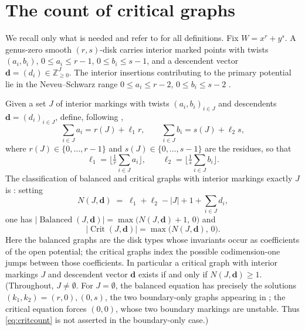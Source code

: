 \documentclass[11pt]{amsart}
\theoremstyle{definition}
\theoremstyle{remark}
\newcommand{\ZZ}{\mathbb{Z}}
\newcommand{\Crit}{\operatorname{Crit}}
\newcommand{\Bal}{\operatorname{Balanced}}
\begin{document}
\section{The count of critical graphs}
\label{sec:count}

We recall only what is needed and refer to \cite{GKT} for all definitions. Fix
$W=x^{r}+y^{s}$. A genus-zero smooth $(r,s)$-disk carries interior marked points
with twists $(a_{i},b_{i})$, $0\leq a_{i}\leq r-1$, $0\leq b_{i}\leq s-1$, and a
descendent vector $\mathbf d=(d_{i})\in\ZZ_{\geq0}^{J}$. The interior insertions
contributing to the primary potential lie in the Neveu--Schwarz range
$0\leq a_{i}\leq r-2$, $0\leq b_{i}\leq s-2$ \cite[eqn.~(0.5)]{GKT}.

Given a set $J$ of interior markings with twists $(a_{i},b_{i})_{i\in J}$ and
descendents $\mathbf d=(d_{i})_{i\in J}$, define, following
\cite[Notation~2.30]{GKT},
\begin{equation}
\label{eq:ells}
\sum_{i\in J}a_{i}=r(J)+\ell_{1}r,\qquad
\sum_{i\in J}b_{i}=s(J)+\ell_{2}s,
\end{equation}
where $r(J)\in\{0,\dots,r-1\}$ and $s(J)\in\{0,\dots,s-1\}$ are the residues, so
that
\begin{equation}
\label{eq:elldef}
\ell_{1}=\Big\lfloor\tfrac{1}{r}\textstyle\sum_{i\in J}a_{i}\Big\rfloor,\qquad
\ell_{2}=\Big\lfloor\tfrac{1}{s}\textstyle\sum_{i\in J}b_{i}\Big\rfloor.
\end{equation}
The classification of balanced and critical graphs with interior markings
exactly $J$ is \cite[Notation~2.40]{GKT}: setting
\begin{equation}
\label{eq:N}
N(J,\mathbf d)\;=\;\ell_{1}+\ell_{2}-|J|+1+\sum_{i\in J}d_{i},
\end{equation}
one has $\bigl|\Bal(J,\mathbf d)\bigr|=\max\bigl(N(J,\mathbf d)+1,\,0\bigr)$ and
\begin{equation}
\label{eq:critcount}
\bigl|\Crit(J,\mathbf d)\bigr|=\max\bigl(N(J,\mathbf d),\,0\bigr).
\end{equation}
Here the balanced graphs are the disk types whose invariants occur as
coefficients of the open potential; the critical graphs index the possible
codimension-one jumps between those coefficients.
In particular a critical graph with interior markings $J$ and descendent vector
$\mathbf d$ exists if and only if $N(J,\mathbf d)\geq1$. (Throughout,
$J\neq\emptyset$. For $J=\emptyset$, the balanced equation has precisely the
solutions $(k_{1},k_{2})=(r,0),(0,s)$, the two boundary-only graphs appearing
in \cite[Example~3.4]{GKT}; the critical equation forces $(0,0)$, whose two
boundary markings are unstable. Thus \eqref{eq:critcount} is not asserted in
the boundary-only case.)
\end{document}
